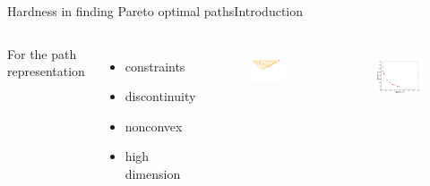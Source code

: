 \begin{frame}{Hardness in finding Pareto optimal paths}{Introduction}
\begin{columns}
For the path representation
\begin{itemize}
\item constraints
\item discontinuity
\item nonconvex
\item high dimension
\end{itemize}
	\begin{figure}
		\centering
		\includegraphics[width=.6\linewidth]{figure/sim1-2obj/MORRTstar00-ALL.png}
		\label{fig:path_solution_space}
	\end{figure}
	\begin{figure}
		\centering
		\includegraphics[width=.6\linewidth]{figure/sim1-2obj/PF01-MORRT.png}
		\label{fig:path_fitness_space}
	\end{figure}
\end{columns}
\end{frame}